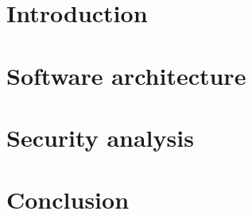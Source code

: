 \documentclass[a4paper,11pt,oneside]{article}
\begin{document}
\newpage
\section{Introduction}

\section{Software architecture}

\section{Security analysis}

\section{Conclusion}




\end{document}
